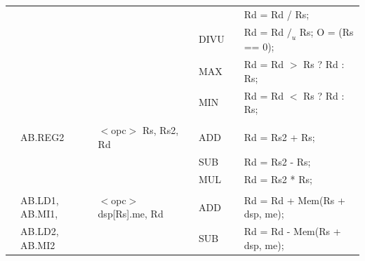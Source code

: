 \begin{table}
\begin{center}
\begin{tabular}{llllll}
                   &                   &                                       &                   &                   & Rd = Rd / Rs;                                                                 \\
                   &                   &                                       & DIVU              & \flags{!---}      & Rd = Rd $/_u$ Rs; O = (Rs == 0);                                              \\
                   &                   &                                       & MAX               & \flags{----}      & Rd = Rd $>$ Rs ? Rd : Rs;                                                     \\
                   &                   &                                       & MIN               & \flags{----}      & Rd = Rd $<$ Rs ? Rd : Rs;                                                     \\
                   &                   &                                       &                   &                   &                                                                               \\
                   & AB.REG2           & $<$opc$>$ Rs, Rs2, Rd                 & ADD               & \flags{****}      & Rd = Rs2 + Rs;                                                                \\
                   &                   &                                       & SUB               & \flags{****}      & Rd = Rs2 - Rs;                                                                \\
                   &                   &                                       & MUL               & \flags{----}      & Rd = Rs2 * Rs;                                                                \\
                   &                   &                                       &                   &                   &                                                                               \\
                   & AB.LD1, AB.MI1,   & $<$opc$>$ dsp[Rs].me, Rd              & ADD               & \flags{****}      & Rd = Rd + Mem(Rs + dsp, me);                                                  \\
                   & AB.LD2, AB.MI2    &                                       & SUB               & \flags{****}      & Rd = Rd - Mem(Rs + dsp, me);                                                  \\

\end{tabular}
\end{center}
\end{table}
